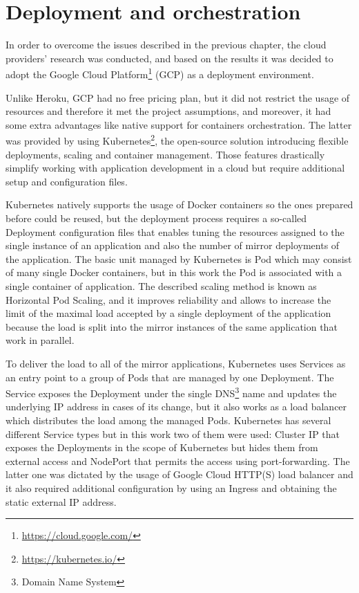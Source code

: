 \section{Deployment and orchestration}\label{sec:deployment-and-orchestration}
In order to overcome the issues described in the previous chapter, the cloud providers' research was conducted, and based on the results it was decided to adopt the Google Cloud Platform\footnote{\url{https://cloud.google.com/}} (GCP) as a deployment environment.

Unlike Heroku, GCP had no free pricing plan, but it did not restrict the usage of resources and therefore it met the project assumptions, and moreover, it had some extra advantages like native support for containers orchestration.
The latter was provided by using Kubernetes\footnote{\url{https://kubernetes.io/}}, the open-source solution introducing flexible deployments, scaling and container management.
Those features drastically simplify working with application development in a cloud but require additional setup and configuration files.

Kubernetes natively supports the usage of Docker containers so the ones prepared before could be reused, but the deployment process requires a so-called Deployment configuration files that enables tuning the resources assigned to the single instance of an application and also the number of mirror deployments of the application.
The basic unit managed by Kubernetes is Pod which may consist of many single Docker containers, but in this work the Pod is associated with a single container of application.
The described scaling method is known as Horizontal Pod Scaling, and it improves reliability and allows to increase the limit of the maximal load accepted by a single deployment of the application because the load is split into the mirror instances of the same application that work in parallel.

To deliver the load to all of the mirror applications, Kubernetes uses Services as an entry point to a group of Pods that are managed by one Deployment.
The Service exposes the Deployment under the single DNS\footnote{Domain Name System} name and updates the underlying IP address in cases of its change, but it also works as a load balancer which distributes the load among the managed Pods.
Kubernetes has several different Service types but in this work two of them were used: Cluster IP that exposes the Deployments in the scope of Kubernetes but hides them from external access and NodePort that permits the access using port-forwarding.
The latter one was dictated by the usage of Google Cloud HTTP(S) load balancer and it also required additional configuration by using an Ingress and obtaining the static external IP address.

